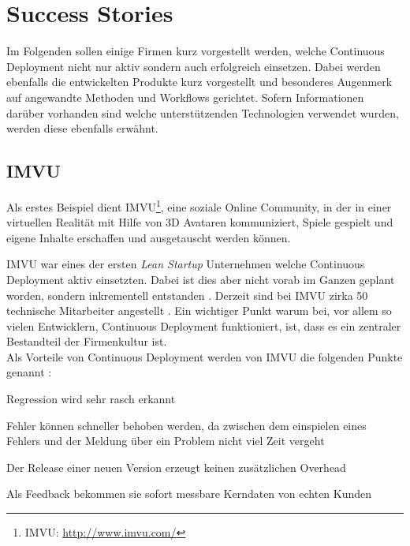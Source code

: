 \section{Success Stories}
\label{sec:success-stories}

Im Folgenden sollen einige Firmen kurz vorgestellt werden, welche Continuous
Deployment nicht nur aktiv sondern auch erfolgreich einsetzen. Dabei werden
ebenfalls die entwickelten Produkte kurz vorgestellt und besonderes Augenmerk
auf angewandte Methoden und Workflows gerichtet. Sofern Informationen darüber
vorhanden sind welche unterstützenden Technologien verwendet wurden, werden
diese ebenfalls erwähnt.


\subsection{IMVU}
\label{subsec:imvu}

Als erstes Beispiel dient IMVU\footnote{IMVU: \url{http://www.imvu.com/}},
eine soziale Online Community, in der in einer virtuellen Realität mit Hilfe
von 3D Avataren kommuniziert, Spiele gespielt und eigene Inhalte erschaffen
und ausgetauscht werden können.

IMVU war eines der ersten \emph{Lean Startup} Unternehmen welche Continuous
Deployment aktiv einsetzten. Dabei ist dies aber nicht vorab im Ganzen geplant
worden, sondern inkrementell entstanden \cite{Fitz2009-02-10}. Derzeit sind
bei IMVU zirka 50 technische Mitarbeiter angestellt \cite{imvu10}. Ein
wichtiger Punkt warum bei, vor allem so vielen Entwicklern, Continuous
Deployment funktioniert, ist, dass es ein zentraler Bestandteil der
Firmenkultur ist. \\
Als Vorteile von Continuous Deployment werden von IMVU die folgenden Punkte
genannt \cite{imvu10}:

\begin{itemize*}
    \item Regression wird sehr rasch erkannt
    \item Fehler können schneller behoben werden, da zwischen dem einspielen
          eines Fehlers und der Meldung über ein Problem nicht viel Zeit vergeht
    \item Der Release einer neuen Version erzeugt keinen zusätzlichen Overhead
    \item Als Feedback bekommen sie sofort messbare Kerndaten von echten Kunden
\end{itemize*}

